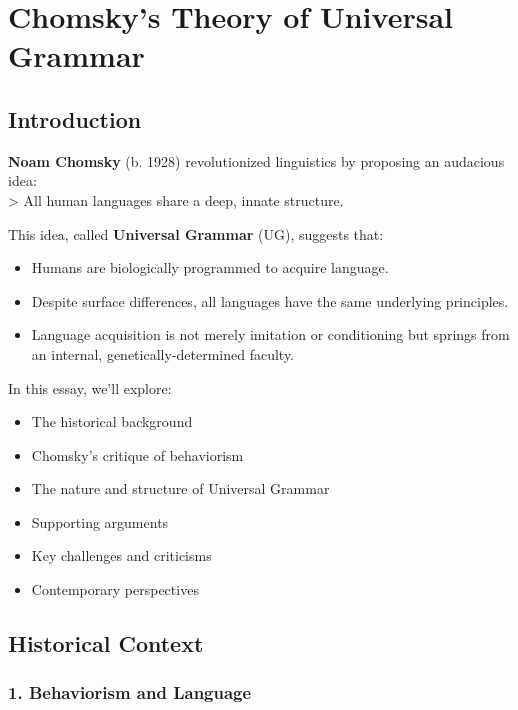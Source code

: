 \documentclass[12pt]{article}
\newcommand{\tightlist}{\itemsep 0pt\parskip 0pt\parsep 0pt}
\begin{document}
\hypertarget{chomskys-theory-of-universal-grammar}{%
\section{Chomsky's Theory of Universal
Grammar}\label{chomskys-theory-of-universal-grammar}}

\hypertarget{introduction}{%
\subsection{Introduction}\label{introduction}}

\textbf{Noam Chomsky} (b. 1928) revolutionized linguistics by proposing
an audacious idea:\\
\textgreater{} All human languages share a deep, innate structure.

This idea, called \textbf{Universal Grammar} (UG), suggests that:

\begin{itemize}
\tightlist
\item
  Humans are biologically programmed to acquire language.
\item
  Despite surface differences, all languages have the same underlying
  principles.
\item
  Language acquisition is not merely imitation or conditioning but
  springs from an internal, genetically-determined faculty.
\end{itemize}

In this essay, we'll explore:

\begin{itemize}
\tightlist
\item
  The historical background
\item
  Chomsky's critique of behaviorism
\item
  The nature and structure of Universal Grammar
\item
  Supporting arguments
\item
  Key challenges and criticisms
\item
  Contemporary perspectives
\end{itemize}

\hypertarget{historical-context}{%
\subsection{Historical Context}\label{historical-context}}

\hypertarget{behaviorism-and-language}{%
\subsubsection{1. Behaviorism and
Language}\label{behaviorism-and-language}}
\end{document}
